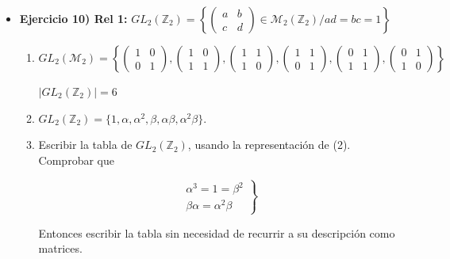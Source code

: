 \documentclass{article}
\begin{document}
\begin{itemize}
\item \textbf{Ejercicio 10) Rel 1:} $GL_2(\mathbb{Z}_2)=\left\lbrace
\begin{pmatrix}
a & b \\
c & d
\end{pmatrix}
\in \mathcal{M}_2(\mathbb{Z}_2) /ad=bc=1\right\rbrace$ 
\begin{enumerate}[(1)]
\item 
\begin{equation*}
GL_2(\mathcal{M}_2)=\left\lbrace
\begin{pmatrix}
1 & 0 \\
0 & 1
\end{pmatrix},
\begin{pmatrix}
1 & 0 \\
1 & 1
\end{pmatrix},
\begin{pmatrix}
1 & 1 \\
1 & 0
\end{pmatrix},
\begin{pmatrix}
1 & 1 \\
0 & 1
\end{pmatrix},
\begin{pmatrix}
0 & 1 \\
1 & 1
\end{pmatrix},
\begin{pmatrix}
0 & 1 \\
1 & 0
\end{pmatrix} \right\rbrace
\end{equation*}

$|GL_2(\mathbb{Z}_2)|=6$

\item $GL_2(\mathbb{Z}_2)=\{1,\alpha,\alpha^2,\beta,\alpha\beta,\alpha^2\beta\}$.

\item Escribir la tabla de $GL_2(\mathbb{Z}_2)$, usando la representación de (2). Comprobar que

\begin{equation*}
\left. \begin{array}{c}
\alpha^3=1=\beta^2 \\
\beta\alpha=\alpha^2\beta
\end{array} \right\rbrace
\end{equation*}

Entonces escribir la tabla sin necesidad de recurrir a su descripción como matrices. \\
\end{enumerate}


\end{itemize}
\end{document}
